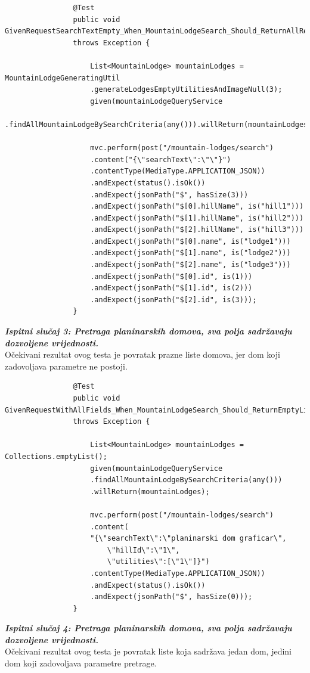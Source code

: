 			
			\begin{lstlisting}
				@Test
				public void GivenRequestSearchTextEmpty_When_MountainLodgeSearch_Should_ReturnAllResults()
				throws Exception {
					
					List<MountainLodge> mountainLodges = MountainLodgeGeneratingUtil
					.generateLodgesEmptyUtilitiesAndImageNull(3);
					given(mountainLodgeQueryService
					.findAllMountainLodgeBySearchCriteria(any())).willReturn(mountainLodges);
					
					mvc.perform(post("/mountain-lodges/search")
					.content("{\"searchText\":\"\"}")
					.contentType(MediaType.APPLICATION_JSON))
					.andExpect(status().isOk())
					.andExpect(jsonPath("$", hasSize(3)))
					.andExpect(jsonPath("$[0].hillName", is("hill1")))
					.andExpect(jsonPath("$[1].hillName", is("hill2")))
					.andExpect(jsonPath("$[2].hillName", is("hill3")))
					.andExpect(jsonPath("$[0].name", is("lodge1")))
					.andExpect(jsonPath("$[1].name", is("lodge2")))
					.andExpect(jsonPath("$[2].name", is("lodge3")))
					.andExpect(jsonPath("$[0].id", is(1)))
					.andExpect(jsonPath("$[1].id", is(2)))
					.andExpect(jsonPath("$[2].id", is(3)));
				}
		\end{lstlisting}
			\textbf{\textit{Ispitni slučaj 3: Pretraga planinarskih domova, sva polja sadržavaju dozvoljene vrijednosti.}}\\
			Očekivani rezultat ovog testa je povratak prazne liste domova, jer dom koji zadovoljava parametre ne postoji.\\
			
			
			\begin{lstlisting}
				@Test
				public void GivenRequestWithAllFields_When_MountainLodgeSearch_Should_ReturnEmptyList()
				throws Exception {
					
					List<MountainLodge> mountainLodges = Collections.emptyList();
					given(mountainLodgeQueryService
					.findAllMountainLodgeBySearchCriteria(any()))
					.willReturn(mountainLodges);
					
					mvc.perform(post("/mountain-lodges/search")
					.content(
					"{\"searchText\":\"planinarski dom graficar\",
						\"hillId\":\"1\",
						\"utilities\":[\"1\"]}")
					.contentType(MediaType.APPLICATION_JSON))
					.andExpect(status().isOk())
					.andExpect(jsonPath("$", hasSize(0)));
				}
			\end{lstlisting}
		
		
				\textbf{\textit{Ispitni slučaj 4: Pretraga planinarskih domova, sva polja sadržavaju dozvoljene vrijednosti.}}\\
				Očekivani rezultat ovog testa je povratak liste koja sadržava jedan dom, jedini dom koji zadovoljava parametre pretrage.\\
				
